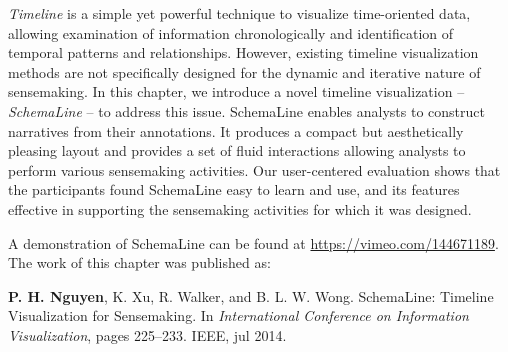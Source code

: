 \emph{Timeline} is a simple yet powerful technique to visualize time-oriented data, allowing examination of information chronologically and identification of temporal patterns and relationships. However, existing timeline visualization methods are not specifically designed for the dynamic and iterative nature of sensemaking. In this chapter, we introduce a novel timeline visualization -- \emph{SchemaLine} -- to address this issue. SchemaLine enables analysts to construct narratives from their annotations. It produces a compact but aesthetically pleasing layout and provides a set of fluid interactions allowing analysts to perform various sensemaking activities. Our user-centered evaluation shows that the participants found SchemaLine easy to learn and use, and its features effective in supporting the sensemaking activities for which it was designed.

A demonstration of SchemaLine can be found at \url{https://vimeo.com/144671189}. The work of this chapter was published as:

\textbf{P. H. Nguyen}, K. Xu, R. Walker, and B. L. W. Wong. SchemaLine: Timeline Visualization for Sensemaking. In \textit{International Conference on Information Visualization}, pages 225--233. IEEE, jul 2014. 






